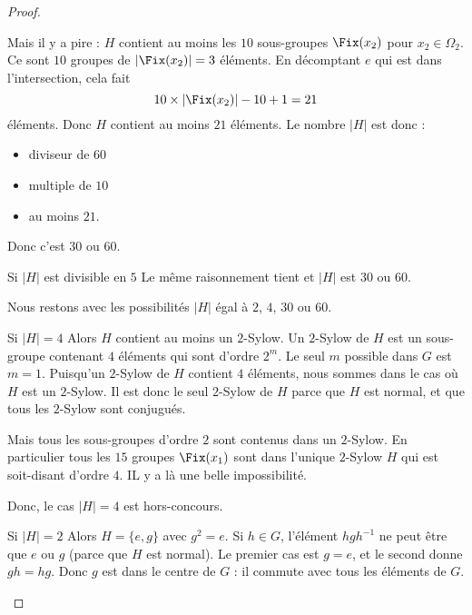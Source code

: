\begin{proof}
\begin{subproof}
		Mais il y a pire : \( H\) contient au moins les \( 10\) sous-groupes \( \Fix(x_2)\) pour \( x_2\in \Omega_2\). Ce sont \( 10\) groupes de \( | \Fix(x_2) |=3\) éléments. En décomptant \( e\) qui est dans l'intersection, cela fait
		\begin{equation}
			10\times | \Fix(x_2) |-10+1=21
		\end{equation}
		éléments. Donc \( H\) contient au moins \( 21\) éléments. Le nombre \( | H |\) est donc :
		\begin{itemize}
			\item diviseur de \( 60\)
			\item multiple de \( 10\)
			\item au moins \( 21\).
		\end{itemize}
		Donc c'est \( 30\) ou \( 60\).

		\item[Si \( | H |\) est divisible en \( 5\)]
		Le même raisonnement tient et \( | H |\) est \( 30\) ou \( 60\).
	\end{subproof}

	Nous restons avec les possibilités \( | H |\) égal à \( 2\), \( 4\), \( 30\) ou \( 60\).

	\begin{subproof}
		\item[Si \( | H | = 4\)]
		Alors \( H\) contient au moins un \( 2\)-Sylow. Un \( 2\)-Sylow de \( H\) est un sous-groupe contenant \( 4\) éléments qui sont d'ordre \( 2^m\). Le seul \( m\) possible dans \( G\) est \( m=1\). Puisqu'un \( 2\)-Sylow de \( H\) contient \( 4\) éléments, nous sommes dans le cas où \( H\) est un \( 2\)-Sylow. Il est donc le seul \( 2\)-Sylow de \( H\) parce que \( H\) est normal, et que tous les \( 2\)-Sylow sont conjugués.

		Mais tous les sous-groupes d'ordre \( 2\) sont contenus dans un \( 2\)-Sylow. En particulier tous les \( 15\) groupes \( \Fix(x_1)\) sont dans l'unique \( 2\)-Sylow \( H\) qui est soit-disant d'ordre \( 4\). IL y a là une belle impossibilité.

		Donc, le cas \( | H |=4\) est hors-concours.

		\item[Si \( | H |=2\)]
		Alors \( H=\{ e,g \}\) avec \( g^2=e\). Si \( h\in G\), l'élément \( hgh^{-1}\) ne peut être que \( e\) ou \( g\) (parce que \( H\) est normal). Le premier cas est \( g=e\), et le second donne \( gh=hg\). Donc \( g\) est dans le centre de \( G\) : il commute avec tous les éléments de \( G\).


\end{subproof}
\end{proof}
